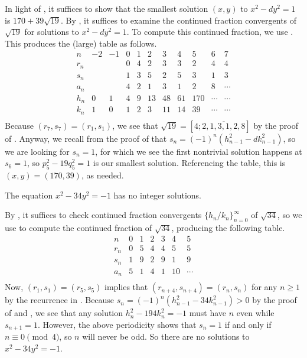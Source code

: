 \documentclass[../notes.tex]{subfiles}
\begin{document}
\begin{solution}
	In light of , it suffices to show that the smallest solution $(x,y)$ to $x^2-dy^2=1$ is $170+39\sqrt{19}$. By , it suffices to examine the continued fraction convergents of $\sqrt{19}$ for solutions to $x^2-dy^2=1$. To compute this continued fraction, we use . This produces the (large) table as follows.
	\[\begin{array}{c|cc|cccccccc}
		  n & -2 & -1 &  0 &  1 &  2 &  3 &  4 &  5 &  6 &  7 \\\hline
		r_n &    &    &  0 &  4 &  2 &  3 &  3 &  2 &  4 &  4 \\
		s_n &    &    &  1 &  3 &  5 &  2 &  5 &  3 &  1 &  3 \\
		a_n &    &    &  4 &  2 &  1 &  3 &  1 &  2 &  8 & \cdots \\\hline
		h_n & 0  & 1  & 4 & 9 & 13& 48& 61&170 & \cdots & \cdots \\
		k_n & 1  & 0  & 1 & 2 & 3 & 11& 14& 39 & \cdots & \cdots \\
	\end{array}\]
	Because $(r_7,s_7)=(r_1,s_1)$, we see that $\sqrt{19}=[4;\overline{2,1,3,1,2,8}]$ by the proof of . Anyway, we recall from the proof of  that $s_n=(-1)^n\left(h_{n-1}^2-dk_{n-1}^2\right)$, so we are looking for $s_n=1$, for which we see the first nontrivial solution happens at $s_6=1$, so $p_5^2-19q_5^2=1$ is our smallest solution. Referencing the table, this is $(x,y)=(170,39)$, as needed.
\end{solution}
\begin{example}
	The equation $x^2-34y^2=-1$ has no integer solutions.
\end{example}
\begin{solution}
	By , it suffices to check continued fraction convergents $\{h_n/k_n\}_{n=0}^\infty$ of $\sqrt{34}$, so we use  to compute the continued fraction of $\sqrt{34}$, producing the following table.
	\[\begin{array}{c|cccccccccc}
		  n &  0 &  1 &  2 &  3 &  4 &  5 \\\hline
		r_n &  0 &  5 &  4 &  4 &  5 &  5 \\
		s_n &  1 &  9 &  2 &  9 &  1 &  9 \\
		a_n &  5 &  1 &  4 &  1 & 10 & \cdots \\
	\end{array}\]
	Now, $(r_1,s_1)=(r_5,s_5)$ implies that $(r_{n+4},s_{n+4})=(r_n,s_n)$ for any $n\ge1$ by the recurrence in . Because $s_n=(-1)^n\left(h_{n-1}^2-34k_{n-1}^2\right)>0$ by the proof of  and , we see that any solution $h_n^2-194k_n^2=-1$ must have $n$ even while $s_{n+1}=1$. However, the above periodicity shows that $s_n=1$ if and only if $n\equiv0\pmod4$, so $n$ will never be odd. So there are no solutions to $x^2-34y^2=-1$.
\end{solution}
\end{document}
